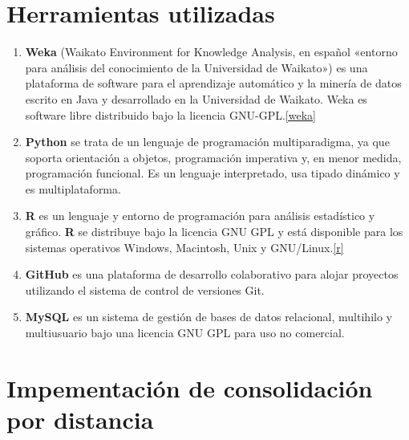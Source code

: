 \documentclass[a4paper, 12pt]{article}
\begin{document}
\pagebreak
\section{Herramientas utilizadas}

\begin{enumerate}
	\item \textbf{Weka} (Waikato Environment for Knowledge Analysis, en espa\~nol «entorno para an\'alisis del conocimiento de la Universidad de Waikato») es una plataforma de software para el aprendizaje autom\'atico y la miner\'ia de datos escrito en Java y desarrollado en la Universidad de Waikato. Weka es software libre distribuido bajo la licencia GNU-GPL.\ref{weka}
	
	\item \textbf{Python} se trata de un lenguaje de programaci\'on multiparadigma, ya que soporta orientaci\'on a objetos, programaci\'on imperativa y, en menor medida, programaci\'on funcional. Es un lenguaje interpretado, usa tipado dinámico y es multiplataforma.
	
	\item \textbf{R} es un lenguaje y entorno de programaci\'on para an\'alisis estad\'istico y gr\'afico. \textbf{R} se distribuye bajo la licencia GNU GPL y est\'a disponible para los sistemas operativos Windows, Macintosh, Unix y GNU/Linux.\ref{r}
	
	\item \textbf{GitHub} es una plataforma de desarrollo colaborativo para alojar proyectos utilizando el sistema de control de versiones Git.
	
	\item \textbf{MySQL} es un sistema de gesti\'on de bases de datos relacional, multihilo y multiusuario bajo una licencia GNU GPL para uso no comercial.
	
\end{enumerate}


\newpage

\appendix


\section{Impementaci\'on de consolidaci\'on por distancia} \label{App:AppendixA}
\end{document}
